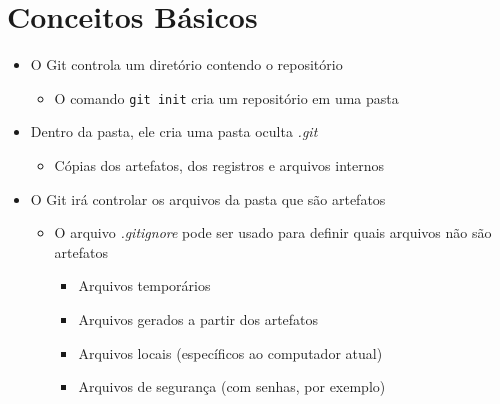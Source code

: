 \documentclass{beamer}
\newenvironment{slide}{\begin{frame}{\insertsection}}{\end{frame}}
\begin{document}
\section{Conceitos Básicos}
\begin{slide}
    \begin{itemize}
        \item O Git controla um diretório contendo o repositório
        \begin{itemize}
            \pause
            \item O comando \texttt{git init} cria um repositório em uma pasta
        \end{itemize}
        \pause
        \item Dentro da pasta, ele cria uma pasta oculta \emph{.git}
        \begin{itemize}
            \pause
            \item Cópias dos artefatos, dos registros e arquivos internos
        \end{itemize}
        \pause
        \item O Git irá controlar os arquivos da pasta que são artefatos
        \begin{itemize}
            \pause
            \item O arquivo \emph{.gitignore} pode ser usado para definir quais
                arquivos não são artefatos
            \begin{itemize}
                \pause
                \item Arquivos temporários
                \pause
                \item Arquivos gerados a partir dos artefatos
                \pause
                \item Arquivos locais (específicos ao computador atual)
                \pause
                \item Arquivos de segurança (com senhas, por exemplo)
            \end{itemize}
        \end{itemize}
    \end{itemize}
\end{slide}
\end{document}

